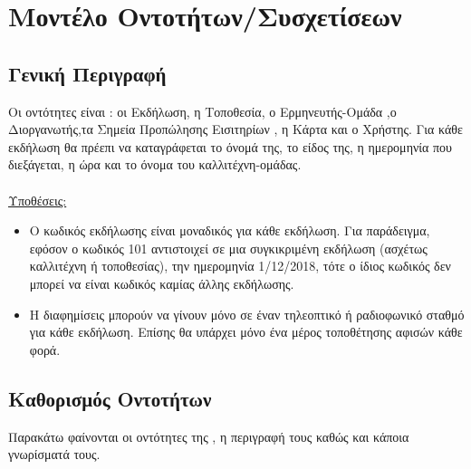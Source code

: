 \section{Μοντέλο Οντοτήτων/Συσχετίσεων}

\subsection{Γενική Περιγραφή}

Οι οντότητες είναι : οι Εκδήλωση, η Τοποθεσία, ο Ερμηνευτής-Ομάδα ,ο Διοργανωτής,τα Σημεία Προπώλησης Εισιτηρίων , η Κάρτα και ο Χρήστης. Για κάθε εκδήλωση θα πρέεπι να καταγράφεται το όνομά της, το είδος της, η ημερομηνία που διεξάγεται, η ώρα και το όνομα του καλλιτέχνη-ομάδας.
\\
\\
\underline{Υποθέσεις:}
\begin{itemize}[noitemsep]

\item Ο κωδικός εκδήλωσης είναι μοναδικός για κάθε εκδήλωση. Για παράδειγμα, εφόσον ο κωδικός 101 αντιστοιχεί σε μια συγκικριμένη εκδήλωση (ασχέτως καλλιτέχνη ή τοποθεσίας), την ημερομηνία 1/12/2018, τότε ο ίδιος κωδικός δεν μπορεί να είναι κωδικός καμίας άλλης εκδήλωσης.
\item Η διαφημίσεις μπορούν να γίνουν μόνο σε έναν τηλεοπτικό ή ραδιοφωνικό σταθμό για κάθε εκδήλωση. Επίσης θα υπάρχει μόνο ένα μέρος τοποθέτησης αφισών κάθε φορά.


\end{itemize}

\subsection{Καθορισμός Οντοτήτων}

Παρακάτω φαίνονται οι οντότητες της \titlos, η περιγραφή τους καθώς και κάποια γνωρίσματά τους.


